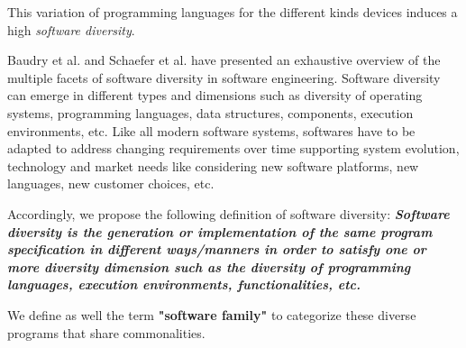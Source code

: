 This variation of programming languages for the different kinds devices induces a high \textit{software diversity}. 

Baudry et al.\cite{baudry2015multiple} and Schaefer et al.\cite{schaefer2012software} have presented an exhaustive overview of the multiple facets of software diversity in software engineering. 
Software diversity can emerge in different types and dimensions such as diversity of operating systems, programming languages, data structures, components, execution environments, etc. 
Like all modern software systems, softwares have to be adapted to address changing requirements over time supporting system evolution, technology and market needs like considering new software platforms, new languages, new customer choices, etc.







Accordingly, we propose the following definition of software diversity: 
\textit{\textbf{Software diversity is the generation or implementation of the same program specification in different ways/manners in order to satisfy one or more diversity dimension such as the diversity of programming languages, execution environments, functionalities, etc. }}
		
We define as well the term \textbf{"software family"} to categorize these diverse programs that share commonalities. 



